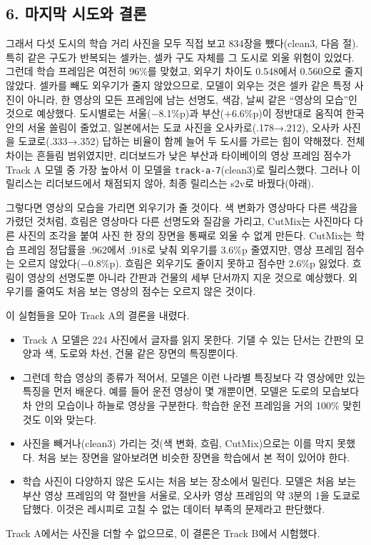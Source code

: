 \documentclass[11pt]{article}
\begin{document}
\subsection*{6. 마지막 시도와 결론}

그래서 다섯 도시의 학습 거리 사진을 모두 직접 보고 834장을 뺐다(clean3, 다음 절). 특히 같은 구도가 반복되는 셀카는, 셀카 구도 자체를 그 도시로 외울 위험이 있었다. 그런데 학습 프레임은 여전히 96\%를 맞혔고, 외우기 차이도 0.548에서 0.560으로 줄지 않았다. 셀카를 빼도 외우기가 줄지 않았으므로, 모델이 외우는 것은 셀카 같은 특정 사진이 아니라, 한 영상의 모든 프레임에 남는 선명도, 색감, 날씨 같은 ``영상의 모습''인 것으로 예상했다. 도시별로는 서울(−8.1\%p)과 부산(+6.6\%p)이 정반대로 움직여 한국 안의 서울 쏠림이 줄었고, 일본에서는 도쿄 사진을 오사카로(.178→.212), 오사카 사진을 도쿄로(.333→.352) 답하는 비율이 함께 늘어 두 도시를 가르는 힘이 약해졌다. 전체 차이는 흔들림 범위였지만, 리더보드가 낮은 부산과 타이베이의 영상 프레임 점수가 Track A 모델 중 가장 높아서 이 모델을 \texttt{track-a-7}(clean3)로 릴리스했다. 그러나 이 릴리스는 리더보드에서 채점되지 않아, 최종 릴리스는 s2v로 바꿨다(아래).

그렇다면 영상의 모습을 가리면 외우기가 줄 것이다. 색 변화가 영상마다 다른 색감을 가렸던 것처럼, 흐림은 영상마다 다른 선명도와 질감을 가리고, CutMix는 사진마다 다른 사진의 조각을 붙여 사진 한 장의 장면을 통째로 외울 수 없게 만든다. CutMix는 학습 프레임 정답률을 .962에서 .918로 낮춰 외우기를 3.6\%p 줄였지만, 영상 프레임 점수는 오르지 않았다(−0.8\%p). 흐림은 외우기도 줄이지 못하고 점수만 2.6\%p 잃었다. 흐림이 영상의 선명도뿐 아니라 간판과 건물의 세부 단서까지 지운 것으로 예상했다. 외우기를 줄여도 처음 보는 영상의 점수는 오르지 않은 것이다.

이 실험들을 모아 Track A의 결론을 내렸다.
\begin{itemize}
\item Track A 모델은 224 사진에서 글자를 읽지 못한다. 기댈 수 있는 단서는 간판의 모양과 색, 도로와 차선, 건물 같은 장면의 특징뿐이다.
\item 그런데 학습 영상의 종류가 적어서, 모델은 이런 나라별 특징보다 각 영상에만 있는 특징을 먼저 배운다. 예를 들어 운전 영상이 몇 개뿐이면, 모델은 도로의 모습보다 차 안의 모습이나 하늘로 영상을 구분한다. 학습한 운전 프레임을 거의 100\% 맞힌 것도 이와 맞는다.
\item 사진을 빼거나(clean3) 가리는 것(색 변화, 흐림, CutMix)으로는 이를 막지 못했다. 처음 보는 장면을 알아보려면 비슷한 장면을 학습에서 본 적이 있어야 한다.
\item 학습 사진이 다양하지 않은 도시는 처음 보는 장소에서 밀린다. 모델은 처음 보는 부산 영상 프레임의 약 절반을 서울로, 오사카 영상 프레임의 약 3분의 1을 도쿄로 답했다. 이것은 레시피로 고칠 수 없는 데이터 부족의 문제라고 판단했다.
\end{itemize}
Track A에서는 사진을 더할 수 없으므로, 이 결론은 Track B에서 시험했다.
\end{document}
